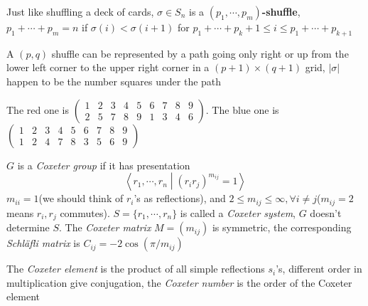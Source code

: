 \documentclass[main]{subfiles}
\begin{document}
\begin{definition}\label{Definition for shuffle}
Just like shuffling a deck of cards, $\sigma\in S_n$ is a $(p_1,\cdots,p_m)$\textbf{-shuffle}, $p_1+\cdots+p_m=n$ if $\sigma(i)<\sigma(i+1)$ for $p_1+\cdots+p_k+1\leq i\leq p_1+\cdots+p_{k+1}$ \par
A $(p,q)$ shuffle can be represented by a path going only right or up from the lower left corner to the upper right corner in a $(p+1)\times(q+1)$ grid, $|\sigma|$ happen to be the number squares under the path
\end{definition}

\begin{example}[$(5,4)$ shuffles in $S_9$]
The red one is $\begin{pmatrix}
1&2&3&4&5&6&7&8&9 \\
2&5&7&8&9&1&3&4&6
\end{pmatrix}$. The blue one is $\begin{pmatrix}
1&2&3&4&5&6&7&8&9 \\
1&2&4&7&8&3&5&6&9
\end{pmatrix}$
\begin{center}
\end{center}
\end{example}

\begin{definition}
$G$ is a \textit{Coxeter group} if it has presentation
\[\left\langle r_1,\cdots,r_n\middle|(r_ir_j)^{m_{ij}}=1\right\rangle\]
$m_{ii}=1$(we should think of $r_i$'s as reflections), and $2\leq m_{ij}\leq\infty,\forall i\neq j$($m_{ij}=2$ means $r_i,r_j$ commutes). $S=\{r_1,\cdots,r_n\}$ is called a \textit{Coxeter system}, $G$ doesn't determine $S$. The \textit{Coxeter matrix} $M=(m_{ij})$ is symmetric, the corresponding \textit{Schl\"afli matrix} is $C_{ij}=-2\cos(\pi/m_{ij})$
\end{definition}

\begin{definition}
The \textit{Coxeter element} is the product of all simple reflections $s_i$'s, different order in multiplication give conjugation, the \textit{Coxeter number} is the order of the Coxeter element
\end{definition}
\end{document}
